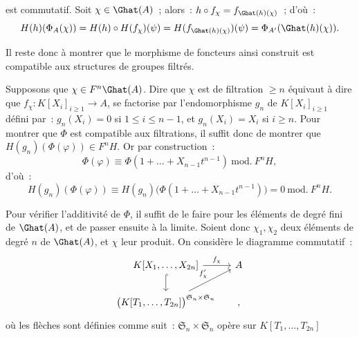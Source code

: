 
est
commutatif. Soit \(\chi\in\Ghat(A)\)~; alors~: \(h\circ f_\chi=f_{\Ghat(h)(\chi)}\)~; d'où~:
\[
  H(h)(\Phi_A(\chi))=H(h)\circ H(f_\chi)(\psi)
  =H(f_{\Ghat(h)(\chi)})(\psi)=\Phi_{A'}(\Ghat(h)(\chi)).
\]

Il reste donc à montrer que le morphisme de foncteurs ainsi construit est compatible aux structures de groupes filtrés.

Supposons que \(\chi\in F^n\Ghat(A)\). Dire que \(\chi\) est de filtration \(\geq n\) équivaut à dire que \(f_\chi:K[X_i]_{i\geq 1}\to A\), se factorise par l'endomorphisme \(g_n\) de \(K[X_i]_{i\geq 1}\) défini par~: \(g_n(X_i)=0\) si \(1\leq i\leq n-1\), et \(g_n(X_i)=X_i\) si \(i\geq n\).
Pour montrer que \(\Phi\) est compatible aux filtrations, il suffit donc de montrer que \(H(g_n)(\Phi(\varphi))\in F^nH\). Or par construction~:
\[
  \Phi(\varphi)\equiv \Phi(1+\ldots+X_{n-1}t^{n-1})\ \mathrm{mod.}\ F^nH,
\]
d'où~:
\[
  H(g_n)(\Phi(\varphi))
  \equiv H(g_n)\bigl(\Phi(1+\ldots+X_{n-1}t^{n-1})\bigr)
  =0\ \mathrm{mod.}\ F^nH.
\]

Pour vérifier l'additivité de \(\Phi\), il suffit de le faire pour les éléments de degré fini de \(\Ghat(A)\), et de passer ensuite à la limite. Soient donc \(\chi_1,\chi_2\) deux éléments de degré \(n\) de \(\Ghat(A)\), et \(\chi\) leur produit. On considère le diagramme commutatif~:
\[
\begin{tikzcd}[column sep=tiny]
K[X_1,\ldots,X_{2n}] \arrow[rr,"f_\chi"] \arrow[d,hook] && A\\
\bigl(K[T_1,\ldots,T_{2n}]\bigr)^{\mathfrak S_n\times\mathfrak S_n}
\arrow[urr,"f'_\chi"] && ,
\end{tikzcd}
\]
où les flèches sont définies comme suit~: \(\mathfrak S_n\times\mathfrak S_n\) opère sur \(K[T_1,\ldots,T_{2n}]\) 
